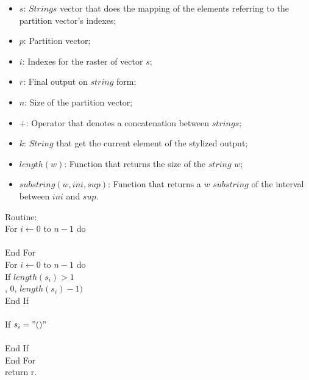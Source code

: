 \documentclass {amsart}
\begin{document}
\begin{itemize}
\item {$s$}: {$Strings$} vector that does the mapping of the
elements referring to the partition vector's indexes;

\item {$p$}: Partition vector;

\item {$i$}: Indexes for the raster of vector {$s$};

\item {$r$}: Final output on {$string$} form;

\item {$n$}: Size of the partition vector;

\item {$+$}: Operator that denotes a concatenation between
{$strings$};

\item {$k$}: {$String$} that get the current element of the
stylized output;

\item {$length(w)$}: Function that returns the size of the
{$string$} {$w$};

\item {$substring(w,ini,sup)$}: Function that returns a {$w$}
{$substring$} of the interval between {$ini$} and {$sup$}.

\end{itemize}
Routine:\\
\indent For {$i \leftarrow 0$} to {$n-1$} do\\
\indent {}\\
\indent End For\\
\indent For {$i \leftarrow 0$} to {$n-1$} do\\
\indent \indent If {$length(s_i) > 1$}\\
\indent \indent {}, {$0$}, {$length(s_i) - 1)$}\\
\indent \indent End If\\
\indent {}\\
\indent \indent If {$s_i = "()"$}\\
\indent \indent {}\\
\indent \indent End If\\
\indent End For\\
return r.

\end{document}
